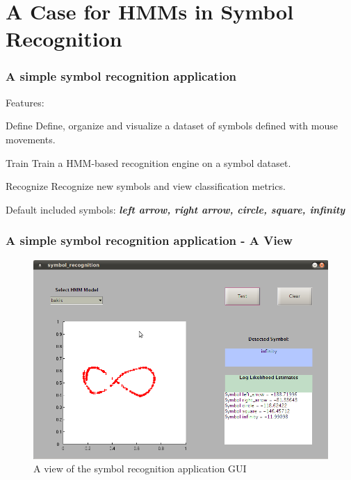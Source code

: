 \section{A Case for HMMs in Symbol Recognition}
\label{sec:sr}

\begin{frame}[t]
	\frametitle{A simple symbol recognition application}
	Features:
	\pause
	\begin{block}{Define}
		Define, organize and visualize a dataset of symbols defined with mouse movements.
	\end{block}
	\pause
	
	\begin{block}{Train}
		Train a HMM-based recognition engine on a symbol dataset.
	\end{block}
	\pause
	
	\begin{block}{Recognize}
		Recognize new symbols and view classification metrics.
	\end{block}
	\pause
	
	\begin{block}{}
		Default included symbols: \textbf{\emph{left arrow, right arrow, circle, square, infinity}}
	\end{block}
\end{frame}

\begin{frame}[t]
	\frametitle{A simple symbol recognition application - A View}
	
	\begin{figure}
  		\centering
		\includegraphics[height=0.70\textheight]{images/infinity.png}
		\caption{\tiny{A view of the symbol recognition application GUI}}
		\label{fig:baum-welch-alg}
  	\end{figure}	
\end{frame}

